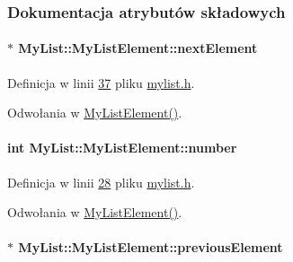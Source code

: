 \subsubsection{Dokumentacja atrybutów składowych}
\hypertarget{class_my_list_1_1_my_list_element_abd7af673552c8876f210cbea01c5e949}{
\paragraph[{next\-Element}]{$\ast$ My\-List\-::\-My\-List\-Element\-::next\-Element}}\label{class_my_list_1_1_my_list_element_abd7af673552c8876f210cbea01c5e949}


Definicja w linii \hyperlink{mylist_8h_source_l00037}{37} pliku \hyperlink{mylist_8h_source}{mylist.\-h}.



Odwołania w \hyperlink{mylist_8cpp_source_l00057}{My\-List\-Element()}.

\hypertarget{class_my_list_1_1_my_list_element_acd6dbb6a8791f034f94678d46395b366}{
\paragraph[{number}]{\setlength{\rightskip}{0pt plus 5cm}int My\-List\-::\-My\-List\-Element\-::number}}\label{class_my_list_1_1_my_list_element_acd6dbb6a8791f034f94678d46395b366}


Definicja w linii \hyperlink{mylist_8h_source_l00028}{28} pliku \hyperlink{mylist_8h_source}{mylist.\-h}.



Odwołania w \hyperlink{mylist_8cpp_source_l00057}{My\-List\-Element()}.

\hypertarget{class_my_list_1_1_my_list_element_adb7c0cbde93a90f30484637498690d0f}{
\paragraph[{previous\-Element}]{$\ast$ My\-List\-::\-My\-List\-Element\-::previous\-Element}}\label{class_my_list_1_1_my_list_element_adb7c0cbde93a90f30484637498690d0f}


